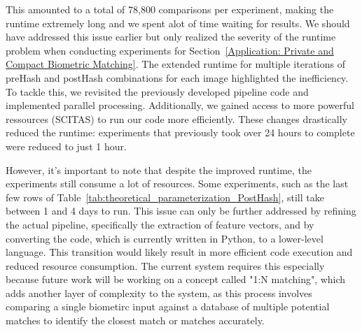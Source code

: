 This amounted to a total of 78,800 comparisons per experiment, making the runtime extremely long and we spent alot of time waiting for results. We should have addressed this issue earlier but only realized the severity of the runtime problem when conducting experiments for Section~\ref{Application: Private and Compact Biometric Matching}. The extended runtime for multiple iterations of preHash and postHash combinations for each image highlighted the inefficiency. To tackle this, we revisited the previously developed pipeline code and implemented parallel processing. Additionally, we gained access to more powerful ressources (SCITAS\cite{ref4}) to run our code more efficiently. These changes drastically reduced the runtime: experiments that previously took over 24 hours to complete were reduced to just 1 hour.

However, it's important to note that despite the improved runtime, the experiments still consume a lot of resources. Some experiments, such as the last few rows of Table~\ref{tab:theoretical_parameterization_PostHash}, still take between 1 and 4 days to run. This issue can only be further addressed by refining the actual pipeline, specifically the extraction of feature vectors, and by converting the code, which is currently written in Python, to a lower-level language. This transition would likely result in more efficient code execution and reduced resource consumption. The current system requires this especially because future work will be working on a concept called "1:N matching", which adds another layer of complexity to the system, as this process involves comparing a single biometirc input against a database of multiple potential matches to identify the closest match or matches accurately.


